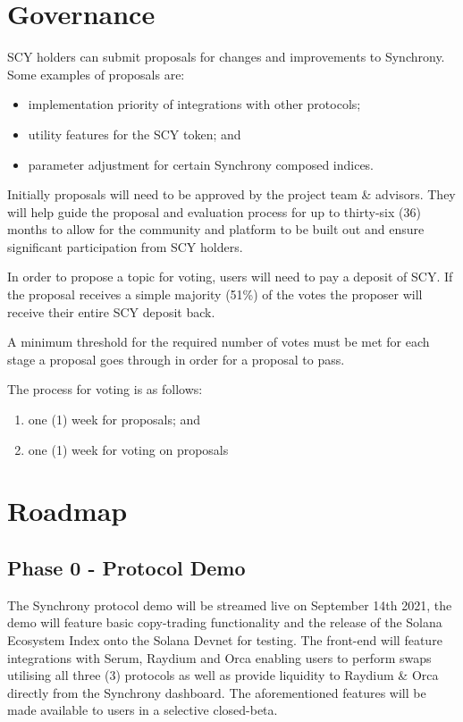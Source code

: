 \documentclass[10pt]{article}
\begin{document}
					\section{Governance}
					SCY holders can submit proposals for changes and improvements to Synchrony. Some
					examples of proposals are:
					\begin{itemize}
						\item implementation priority of integrations with other protocols;
						\item utility features for the SCY token; and
						\item parameter adjustment for certain Synchrony composed indices.
					\end{itemize}

					Initially proposals will need to be approved by the project team \& advisors.
					They will help guide the proposal and evaluation process for up to thirty-six
					(36) months to allow for the community and platform to be built out and ensure
					significant participation from SCY holders.

					In order to propose a topic for voting, users will need to pay a deposit of SCY.
					If the proposal receives a simple majority (51\%) of the votes the proposer
					will receive their entire SCY deposit back.

					A minimum threshold for the required number of votes must be met for each stage
					a proposal goes through in order for a proposal to pass.

					The process for voting is as follows:
					\begin{enumerate}
						\item one (1) week for proposals; and
						\item one (1) week for voting on proposals
					\end{enumerate}

					\section{Roadmap}
					\subsection{Phase 0 - Protocol Demo}
					The Synchrony protocol demo will be streamed live on September 14th 2021, the
					demo will feature basic copy-trading functionality and the release of the Solana
					Ecosystem Index onto the Solana Devnet for testing. The front-end will feature
					integrations with Serum, Raydium and Orca enabling users to perform swaps
					utilising all three (3) protocols as well as provide liquidity to Raydium \&
					Orca directly from the Synchrony dashboard. The aforementioned features will be
					made available to users in a selective closed-beta.
\end{document}
